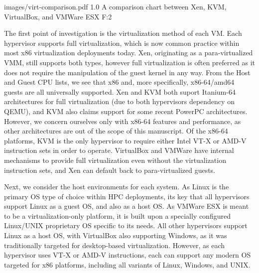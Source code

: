   {images/virt-comparison.pdf}
  {1.0}
  {A comparison chart between Xen, KVM, VirtualBox, and VMWare ESX}
  {F:2}



The first point of investigation is the virtualization method of each VM.  Each hypervisor supports full virtualization, which is now common  practice within most x86 virtualization deployments today.  Xen, originating as a para-virtualized VMM, still supports both types, however full virtualization is often preferred as it does not require the manipulation of the guest kernel in any way.  From the Host and Guest CPU lists, we see that x86 and, more specifically, x86-64/amd64 guests are all universally supported.  Xen and KVM both suport Itanium-64 architectures for full virtualization (due to both hypervisors dependency on QEMU), and KVM also claims support for some recent PowerPC architectures. However, we concern ourselves only with x86-64 features and performance, as other architectures are out of the scope of this manuscript.  Of the x86-64 platforms, KVM is the only hypervisor to require either Intel VT-X or AMD-V instruction sets in order to operate.  VirtualBox and VMWare have internal mechanisms to provide full virtualization even without the virtualization instruction sets, and Xen can default back to para-virtualized guests.  

Next, we consider the host environments for each system.  As Linux is the primary OS type of choice within HPC deployments, its key that all hypervisors support Linux as a guest OS, and also as a host OS. As VMWare ESX is meant to be a virtualization-only platform, it is built upon a specially configured Linux/UNIX proprietary OS specific to its needs.  All other hypervisors support Linux as a host OS, with VirtualBox also supporting Windows, as it was traditionally targeted for desktop-based virtualization.  However, as each hypervisor uses VT-X or AMD-V instructions, each can support any modern OS targeted for x86 platforms, including all variants of Linux, Windows, and UNIX. 

